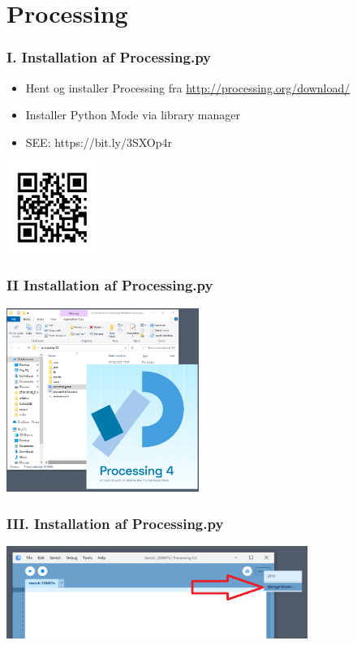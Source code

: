 \documentclass[10pt]{beamer}
\begin{document}
\section{Processing}
\begin{frame}
  \frametitle{I. Installation af Processing.py}

  \begin{itemize}
  \item Hent og installer Processing fra \url{http://processing.org/download/}
  \item Installer Python Mode via library manager
  \item SEE: https://bit.ly/3SXOp4r
  \end{itemize}
   \includegraphics[height=3cm]{images/propy06}
\end{frame}


\begin{frame}
  \frametitle{II Installation af Processing.py}
   
   \vspace{10 mm}
    \hspace{8 em}
   \includegraphics[height=6cm]{images/python00}
\end{frame}

\begin{frame}
  \frametitle{III. Installation af Processing.py}
   \includegraphics[height=3cm]{images/python01}
\end{frame}
\end{document}
